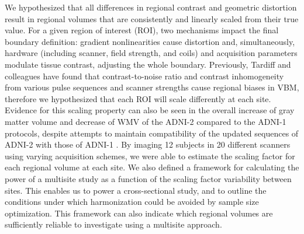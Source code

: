 We hypothesized that all differences in regional contrast and geometric distortion result in regional volumes that are consistently and linearly scaled from their true value. For a given region of interest (ROI), two mechanisms impact the final boundary definition: gradient nonlinearities cause distortion and, simultaneously, hardware  (including scanner, field strength, and coils) and acquisition parameters modulate tissue contrast, adjusting the whole boundary. Previously, Tardiff and colleagues have found that contrast-to-noise ratio and contrast inhomogeneity from various pulse sequences and scanner strengths cause regional biases in VBM\cite{tardif2010regional, tardif2009sensitivity}, therefore we hypothesized that each ROI will scale differently at each site. Evidence for this scaling property can also be seen in the overall increase of gray matter volume and decrease of WMV of the ADNI-2 compared to the ADNI-1 protocols, despite attempts to maintain compatibility of the updated sequences of ADNI-2 with those of ADNI-1 \cite{Brunton_2013}. By imaging 12 subjects in 20 different scanners using varying acquisition schemes, we were able to estimate the scaling factor for each regional volume at each site. We also defined a framework for calculating the power of a multisite study as a function of the scaling factor variability between sites. This enables us to power a cross-sectional study, and to outline the conditions under which harmonization could be avoided by sample size optimization. This framework can also indicate which regional volumes are sufficiently reliable to investigate using a multisite approach.